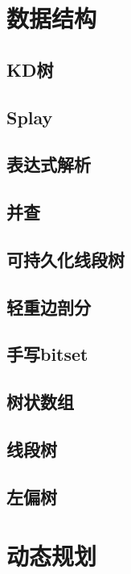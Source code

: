 \documentclass[a4paper]{article}
\begin{document}
\section{数据结构}
\subsection{KD树}

\subsection{Splay}

\subsection{表达式解析}

\subsection{并查}

\subsection{可持久化线段树}

\subsection{轻重边剖分}

\subsection{手写bitset}

\subsection{树状数组}

\subsection{线段树}

\subsection{左偏树}

\section{动态规划}
\end{document}
